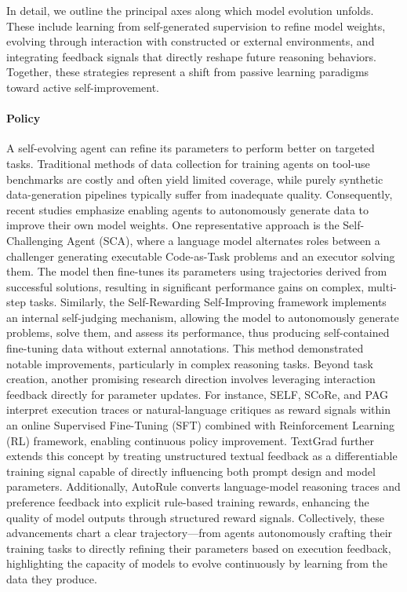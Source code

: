 In detail, we outline the principal axes along which model evolution unfolds. 
These include learning from self-generated supervision to refine model weights, 
evolving through interaction with constructed or external environments, and
integrating feedback signals that directly reshape future reasoning behaviors. Together,
these strategies represent a shift from passive learning paradigms toward active self-improvement.






\paragraph{Policy}
A self-evolving agent can refine its parameters to perform better on targeted tasks. Traditional methods of data collection for training agents on tool-use benchmarks are costly and often yield limited coverage, while purely synthetic data-generation pipelines typically suffer from inadequate quality. Consequently, recent studies emphasize enabling agents to autonomously generate data to improve their own model weights.
One representative approach is the Self-Challenging Agent (SCA)\citep{zhou2025selfchallenginglanguagemodelagents}, where a language model alternates roles between a challenger generating executable Code-as-Task problems and an executor solving them. The model then fine-tunes its parameters using trajectories derived from successful solutions, resulting in significant performance gains on complex, multi-step tasks. Similarly, the Self-Rewarding Self-Improving framework\citep{simonds2025selfrewardingselfimproving} implements an internal self-judging mechanism, allowing the model to autonomously generate problems, solve them, and assess its performance, thus producing self-contained fine-tuning data without external annotations. This method demonstrated notable improvements, particularly in complex reasoning tasks.
Beyond task creation, another promising research direction involves leveraging interaction feedback directly for parameter updates. For instance, SELF\citep{lu2023self}, SCoRe\citep{kumar2024training}, and PAG\citep{jiang2025pag} interpret execution traces or natural-language critiques as reward signals within an online Supervised Fine-Tuning (SFT) combined with Reinforcement Learning (RL) framework, enabling continuous policy improvement. TextGrad\citep{yellamraju2024textgrad} further extends this concept by treating unstructured textual feedback as a differentiable training signal capable of directly influencing both prompt design and model parameters. Additionally, AutoRule\citep{wang2025autorule} converts language-model reasoning traces and preference feedback into explicit rule-based training rewards, enhancing the quality of model outputs through structured reward signals. 
Collectively, these advancements chart a clear trajectory—from agents autonomously crafting their training tasks to directly refining their parameters based on execution feedback, highlighting the capacity of models to evolve continuously by learning from the data they produce.
